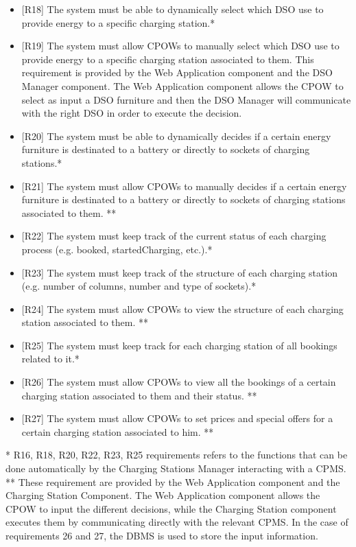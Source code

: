 \documentclass[a4paper]{report}
\begin{document}
\begin{itemize}
    \item{[R18]} \label{R18} The system must be able to dynamically select which DSO use to provide energy to a specific charging station.*
    \item{[R19]} \label{R19} The system must allow CPOWs to manually select which DSO use to provide energy to a specific charging station associated to them. This requirement is provided by the Web Application component and the DSO Manager component. The Web Application component allows the CPOW to select as input a DSO furniture and then the DSO Manager will communicate with the right DSO in order to execute the decision.
    \item{[R20]} \label{R20} The system must be able to dynamically decides if a certain energy furniture is destinated to a battery or directly to sockets of charging stations.*
    \item{[R21]} \label{R21} The system must allow CPOWs to manually decides if a certain energy furniture is destinated to a battery or directly to sockets of charging stations associated to them. **
    \item{[R22]} \label{R22} The system must keep track of the current status of each charging process (e.g. booked, startedCharging, etc.).*
    \item{[R23]} \label{R23} The system must keep track of the structure of each charging station (e.g. number of columns, number and type of sockets).*
    \item{[R24]} \label{R24} The system must allow CPOWs to view the structure of each charging station associated to them. **
    \item{[R25]} \label{R25} The system must keep track for each charging station of all bookings related to it.*
    \item{[R26]} \label{R26} The system must allow CPOWs to view all the bookings of a certain charging station associated to them and their status. **
    \item{[R27]} \label{R27} The system must allow CPOWs to set prices and special offers for a certain charging station associated to him. **
\end{itemize}
* R16, R18, R20, R22, R23, R25 requirements refers to the functions that can be done automatically by the Charging Stations Manager interacting with a CPMS.\newline
** These requirement are provided by the Web Application component and the Charging Station Component. The Web Application component allows the CPOW to input the different decisions, while the Charging Station component executes them by communicating directly with the relevant CPMS. In the case of requirements 26 and 27, the DBMS is used to store the input information.
\end{document}
